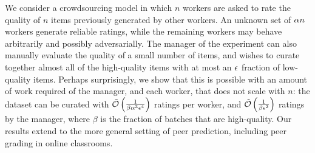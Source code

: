 We consider a crowdsourcing model in which $n$ workers are asked to 
rate the quality of $n$ items previously generated by other workers.
An unknown set of $\alpha n$ workers generate reliable ratings, 
while the remaining workers may behave arbitrarily and possibly adversarially. 
The manager of the experiment can also manually evaluate the quality of a 
small number of items, and wishes to curate together almost all 
of the high-quality items with at most an $\epsilon$ fraction of 
low-quality items.  
Perhaps surprisingly, we show that this is possible with an 
amount of work required of the manager, and each worker, that does not scale 
with $n$: the dataset can be curated with
$\tilde{\mathcal{O}}\left( \frac{1}{\beta\alpha^3\epsilon^4} \right)$ 
ratings per worker, and $\tilde{\mathcal{O}}\left( \frac{1}{\beta\epsilon^2} \right)$ 
ratings by the manager, where $\beta$ is the fraction of batches that are 
high-quality.
Our results extend to the more general setting of peer prediction, 
including peer grading in online classrooms.

